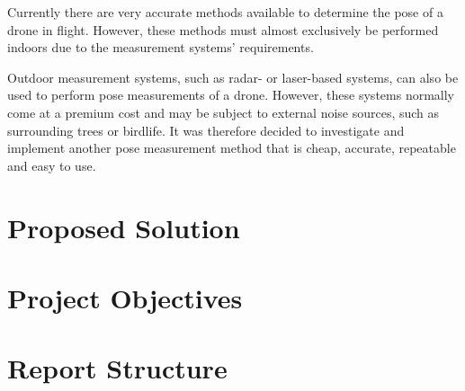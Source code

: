 Currently there are very accurate methods available to determine the pose of a drone in flight. However, these methods must almost exclusively be performed indoors due to the measurement systems' requirements.

Outdoor measurement systems, such as radar- or laser-based systems, can also be used to perform pose measurements of a drone. However, these systems normally come at a premium cost and may be subject to external noise sources, such as surrounding trees or birdlife. It was therefore decided to investigate and implement another pose measurement method that is cheap, accurate, repeatable and easy to use. 

\section{Proposed Solution}



\section{Project Objectives}

\section{Report Structure}
